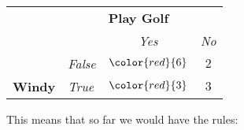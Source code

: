 	\begin{table}[H]
		\centering
		\begin{tabular}{|l|l|c|c|}
		\hline
		\multicolumn{2}{|l|}{} & \multicolumn{2}{l|}{\cellcolor[HTML]{FFCCC9}\textbf{Play Golf}} \\ \cline{3-4} 
		\multicolumn{2}{|l|}{\multirow{-2}{*}{}} & \cellcolor[HTML]{FFCCC9}\textit{Yes} & \cellcolor[HTML]{FFCCC9}\textit{No} \\ \hline
		\cellcolor[HTML]{ECF4FF} & \cellcolor[HTML]{ECF4FF}\textit{False} & $\color{red}{6}$ & $2$ \\ \cline{2-4} 
		\multirow{-2}{*}{\cellcolor[HTML]{ECF4FF}\textbf{\phantom{xxx}Windy\phantom{xxx}}} & \cellcolor[HTML]{ECF4FF}\textit{True\phantom{xxxx}} & $\color{red}{3}$ & $3$ \\ \hline
		\end{tabular}
	\end{table}
	This means that so far we would have the rules:
